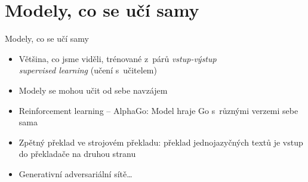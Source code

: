 \documentclass[aspectratio=169,dvipsnames]{beamer}
\begin{document}




\section{Modely, co se učí samy}


\begin{frame}{Modely, co se učí samy}

    \begin{itemize}[<+->]

        \item Většina, co jsme viděli, trénované z~párů \emph{vstup-výstup}
            \\ \quad\emph{supervised learning} (učení s~učitelem)

        \item Modely se mohou učit od sebe navzájem

        \item Reinforcement learning -- AlphaGo: Model hraje Go s~různými
            verzemi sebe sama \\ {\tiny \citep{singh2017learning}}

        \item Zpětný překlad ve strojovém překladu: překlad jednojazyčných
            textů je vstup do překladače na druhou stranu {\tiny \citep{sennrich2016improving}}

        \item Generativní adversariální sítě\ldots

    \end{itemize}

\end{frame}

\end{document}
